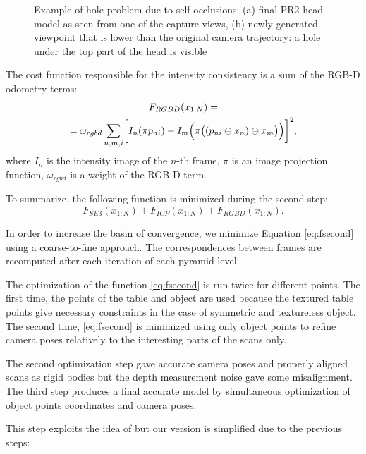 \documentclass[letterpaper, 10 pt, conference]{ieeeconf}  %
\begin{document}
\begin{figure}[t]
\begin{subfigure}[b]{0.45\linewidth}
                \caption{}
        \end{subfigure}
        \caption{Example of hole problem due to self-occlusions:
        (a) final PR2 head model as seen from one of the capture views,
        (b) newly generated viewpoint that is lower than the original camera trajectory: a hole under 
        the top part of the head is visible}
        \label{fig:pr2}
\end{figure}

The cost function responsible for the intensity consistency is
a sum of the RGB-D odometry terms:
\begin{multline} \label{eq:frgbd}
F_{RGBD}(x_{1:N}) = \\
= \omega_{rgbd} \sum_{n,m,i} \biggl[I_n(\pi p_{ni}) - I_m\Bigl(\pi \bigl((p_{ni} \oplus x_n) \ominus x_m\bigr)\Bigr) \biggr]^2,
\end{multline}
where $I_n$ is the intensity image of the $n$-th frame, $\pi$ is an image projection function, $\omega_{rgbd}$
is a weight of the RGB-D term.

To summarize, the following function is minimized during the second step:
\begin{equation} \label{eq:fsecond}
F_{SE3}(x_{1:N}) + F_{ICP}(x_{1:N}) + F_{RGBD}(x_{1:N}).
\end{equation}

In order to increase the basin of convergence,
we minimize Equation \eqref{eq:fsecond} using a coarse-to-fine approach.
The correspondences between frames are recomputed
after each iteration of each pyramid level.

The optimization of the function \eqref{eq:fsecond} is run 
twice for different points. The first time, the points of the table and object are used because 
the textured table points give necessary constraints in the case of symmetric and textureless object.
The second time, \eqref{eq:fsecond} is minimized using only object points to refine 
camera poses relatively to the interesting parts of the scans only.

The second optimization step gave accurate camera poses and properly aligned scans
as rigid bodies but the depth measurement noise gave some misalignment. The third step produces a 
final accurate model by
simultaneous optimization of object points coordinates and camera poses.

This step exploits the idea of \cite{ruhnke2012highly} but our version 
is simplified due to the previous steps: 
\end{document}
